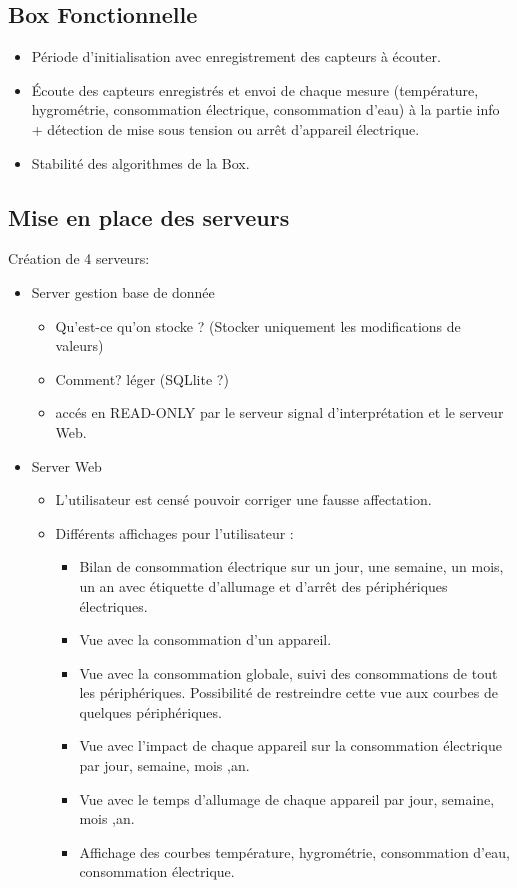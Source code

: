 \documentclass[10pt,a4paper]{article}
\begin{document}
\subsection{Box Fonctionnelle}
\begin{itemize}
  \item Période d'initialisation avec enregistrement des capteurs à écouter.
  \item Écoute des capteurs enregistrés et envoi de chaque mesure (température, hygrométrie, consommation électrique, consommation d'eau) à la partie info + détection de mise sous tension ou arrêt d'appareil électrique.
  \item Stabilité des algorithmes de la Box.
\end{itemize}

\subsection{Mise en place des serveurs}

Création de 4 serveurs:

\begin{itemize}
\item Server gestion base de donnée
\begin{itemize}
\item Qu'est-ce qu'on stocke ? (Stocker uniquement les modifications de valeurs)
\item Comment? léger (SQLlite ?)
\item accés en READ-ONLY par le serveur signal d'interprétation et le serveur Web.
\end{itemize}
\end{itemize}

\begin{itemize}
\item Server Web
\begin{itemize}
\item L'utilisateur est censé pouvoir corriger une fausse affectation.
\item Différents affichages pour l'utilisateur :
\begin{itemize}
  \item Bilan de consommation électrique sur un jour, une semaine, un mois, un an avec étiquette d'allumage et d'arrêt des périphériques électriques.
  \item Vue avec la consommation d'un appareil.
  \item Vue avec la consommation globale, suivi des consommations de tout les périphériques. Possibilité de restreindre cette vue aux courbes de quelques périphériques.
  \item Vue avec l'impact de chaque appareil sur la consommation électrique par jour, semaine, mois ,an.
  \item Vue avec le temps d'allumage de chaque appareil par jour, semaine, mois ,an.
  \item Affichage des courbes température, hygrométrie, consommation d'eau, consommation électrique.
\end{itemize}
\end{itemize}
\end{itemize}
\end{document}
